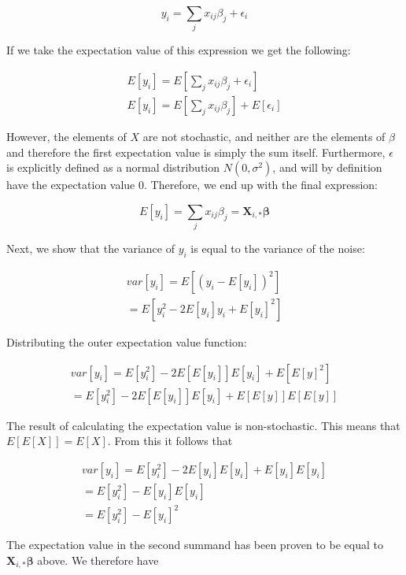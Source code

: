 \documentclass[twocolumn,10pt,cleanfoot]{asme2ej}
\begin{document}
\begin{equation}
y_i = \sum_j x_{ij}\beta_j + \epsilon_i
\end{equation}

If we take the expectation value of this expression we get the following:

\begin{gather}
E[y_i] = E\left[\sum_j x_{ij}\beta_j + \epsilon_i\right] \\
E[y_i] = E\left[\sum_j x_{ij}\beta_j\right] + E[\epsilon_i]
\end{gather}

However, the elements of $X$ are not stochastic, and neither are the elements of $\beta$ and therefore the first expectation value is simply the sum itself. Furthermore, $\epsilon$ is explicitly defined as a normal distribution $N(0,\sigma^2)$, and will by definition have the expectation value $0$. Therefore, we end up with the final expression:

\begin{equation}
E[y_i] = \sum_j x_{ij}\beta_j = \bm{X}_{i,*}\bm{\beta}
\end{equation}

Next, we show that the variance of $y_i$ is equal to the variance of the noise:

\begin{gather}
var[y_i] = E\left[(y_i - E[y_i])^2\right]  \\
= E\left[y_i^2 - 2E[y_i]y_i + E[y_i]^2\right]
\end{gather}

Distributing the outer expectation value function:

\begin{gather}
var[y_i] = E[y_i^2] - 2E\left[E[y_i]\right]E[y_i] + E\left[E[y]^2\right]  \\
= E[y_i^2] - 2E\left[E[y_i]\right]E[y_i] + E\left[E[y]\right]E\left[E[y]\right]
\end{gather}

The result of calculating the expectation value is non-stochastic. This means that $E[E[X]] = E[X]$. From this it follows that

\begin{gather}
var[y_i] = E[y_i^2] - 2E[y_i]E[y_i] + E[y_i]E[y_i]  \\
= E[y_i^2] - E[y_i]E[y_i]  \\
= E[y_i^2] - E[y_i]^2
\end{gather}

The expectation value in the second summand has been proven to be equal to $\bm{X}_{i,*}\bm{\beta}$ above. We therefore have
\end{document}
